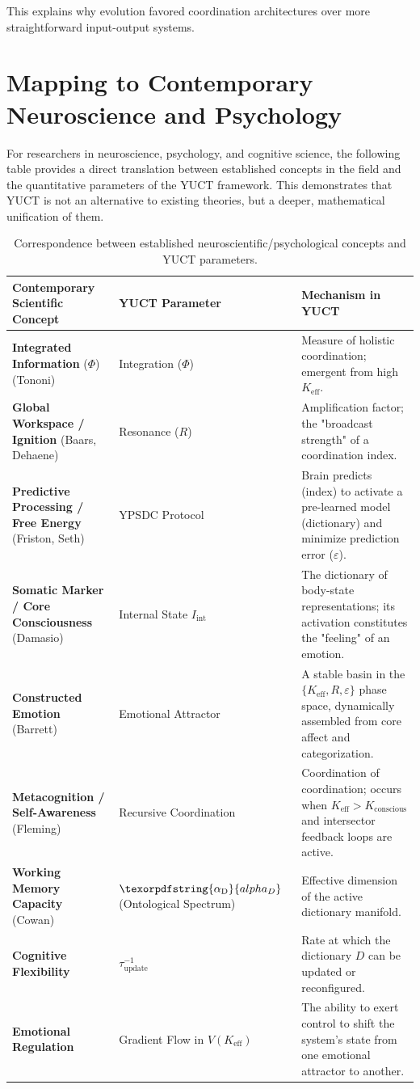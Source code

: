 \documentclass[12pt,a4paper]{article}
\DeclareRobustCommand{\alD}{\texorpdfstring{\ensuremath{\alpha_{\mathrm{D}}}}{alpha_D}}
\begin{document}
	This explains why evolution favored coordination architectures over more straightforward input-output systems.
	
	\section{Mapping to Contemporary Neuroscience and Psychology}
	
	For researchers in neuroscience, psychology, and cognitive science, the following table provides a direct translation between established concepts in the field and the quantitative parameters of the YUCT framework. This demonstrates that YUCT is not an alternative to existing theories, but a deeper, mathematical unification of them.
	
	\begin{table}[H]
		\centering
		\caption{Correspondence between established neuroscientific/psychological concepts and YUCT parameters.}
		\label{tab:mapping}
		\begin{tabular}{p{4.5cm} p{4cm} p{5cm}}
			\toprule
			\textbf{Contemporary Scientific Concept} & \textbf{YUCT Parameter} & \textbf{Mechanism in YUCT} \\
			\midrule
			\textbf{Integrated Information} (\(\Phi\)) (Tononi) & Integration (\(\Phi\)) & Measure of holistic coordination; emergent from high \(K_{\mathrm{eff}}\). \\
			\textbf{Global Workspace / Ignition} (Baars, Dehaene) & Resonance (\(R\)) & Amplification factor; the "broadcast strength" of a coordination index. \\
			\textbf{Predictive Processing / Free Energy} (Friston, Seth) & YPSDC Protocol & Brain predicts (index) to activate a pre-learned model (dictionary) and minimize prediction error (\(\varepsilon\)). \\
			\textbf{Somatic Marker / Core Consciousness} (Damasio) & Internal State \(I_{\mathrm{int}}\) & The dictionary of body-state representations; its activation constitutes the "feeling" of an emotion. \\
			\textbf{Constructed Emotion} (Barrett) & Emotional Attractor & A stable basin in the \(\{K_{\mathrm{eff}}, R, \varepsilon\}\) phase space, dynamically assembled from core affect and categorization. \\
			\textbf{Metacognition / Self-Awareness} (Fleming) & Recursive Coordination & Coordination of coordination; occurs when \(K_{\mathrm{eff}} > K_{\mathrm{conscious}}\) and intersector feedback loops are active. \\
			\textbf{Working Memory Capacity} (Cowan) & \(\alD\) (Ontological Spectrum) & Effective dimension of the active dictionary manifold. \\
			\textbf{Cognitive Flexibility} & \(\tau_{\mathrm{update}}^{-1}\) & Rate at which the dictionary \(D\) can be updated or reconfigured. \\
			\textbf{Emotional Regulation} & Gradient Flow in \(V(K_{\mathrm{eff}})\) & The ability to exert control to shift the system's state from one emotional attractor to another. \\
			\bottomrule
		\end{tabular}
	\end{table}
	
\end{document}
